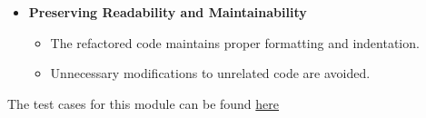 \documentclass[12pt, titlepage]{article}
\begin{document}
\begin{itemize}
    \item \textbf{Preserving Readability and Maintainability}
    \begin{itemize}
        \item The refactored code maintains proper formatting and indentation.
        \item Unnecessary modifications to unrelated code are avoided.
    \end{itemize}
\end{itemize}

\noindent The test cases for this module can be found \href{https://github.com/ssm-lab/capstone--source-code-optimizer/blob/new-poc/tests/refactorers/test_member_ignoring_method.py}{here}








					
					
					


					
\end{document}
